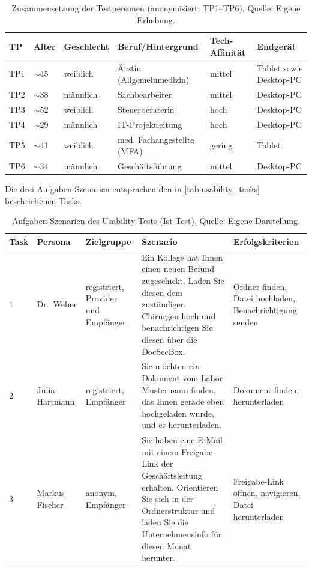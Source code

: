 \begin{table}[H]
    \centering
    \scriptsize
    \begin{tabular}{p{0.8cm}p{1.2cm}p{1.8cm}p{3.5cm}p{2.0cm}p{3.5cm}}
        \toprule
        \textbf{TP} & \textbf{Alter} & \textbf{Geschlecht} & \textbf{Beruf/Hintergrund} & \textbf{Tech-Affinität} & \textbf{Endgerät} \\
        \midrule
        TP1 & $\sim$45 & weiblich & Ärztin (Allgemeinmedizin) & mittel & Tablet sowie Desktop-PC \\
        TP2 & $\sim$38 & männlich & Sachbearbeiter & mittel & Desktop-PC \\
        TP3 & $\sim$52 & weiblich & Steuerberaterin & hoch & Desktop-PC \\
        TP4 & $\sim$29 & männlich & IT-Projektleitung & hoch & Desktop-PC \\
        TP5 & $\sim$41 & weiblich & med. Fachangestellte (MFA) & gering & Tablet \\
        TP6 & $\sim$34 & männlich & Geschäftsführung & mittel & Desktop-PC \\
        \bottomrule
    \end{tabular}
    \caption[Teilnehmende Ist-Test]{Zusammensetzung der Testpersonen (anonymisiert; TP1--TP6). Quelle: Eigene Erhebung.}
    \label{tab:teilnehmende_ist}
\end{table}

Die drei Aufgaben-Szenarien entsprachen den in \autoref{tab:usability_tasks} beschriebenen Tasks.

\begin{table}[H]
    \centering
    \scriptsize
    \begin{tabular}{p{0.4cm}p{2.3cm}p{3.4cm}p{4.8cm}p{4.0cm}}
        \toprule
        \textbf{Task} & \textbf{Persona} & \textbf{Zielgruppe} & \textbf{Szenario} & \textbf{Erfolgskriterien} \\
        \midrule
        1 & Dr.~Weber & registriert, Provider und Empfänger & Ein Kollege hat Ihnen einen neuen Befund zugeschickt. Laden Sie diesen dem zuständigen Chirurgen hoch und benachrichtigen Sie diesen über die DocSecBox. & Ordner finden, Datei hochladen, Benachrichtigung senden \\
        2 & Julia Hartmann & registriert, Empfänger & Sie möchten ein Dokument vom Labor Mustermann finden, das Ihnen gerade eben hochgeladen wurde, und es herunterladen. & Dokument finden, herunterladen \\
        3 & Markus Fischer & anonym, Empfänger & Sie haben eine E-Mail mit einem Freigabe-Link der Geschäftsleitung erhalten. Orientieren Sie sich in der Ordnerstruktur und laden Sie die Unternehmensinfo für diesen Monat herunter. & Freigabe-Link öffnen, navigieren, Datei herunterladen \\
        \bottomrule
    \end{tabular}
    \caption[Aufgaben-Szenarien Ist-Test]{Aufgaben-Szenarien des Usability-Tests (Ist-Test). Quelle: Eigene Darstellung.}
    \label{tab:usability_tasks}
\end{table}

